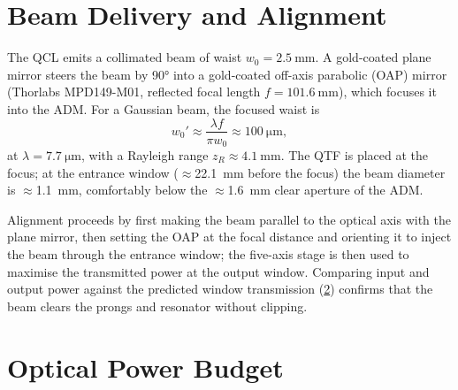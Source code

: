 \section{Beam Delivery and Alignment}
\label{sec:alignment}

The QCL emits a collimated beam of waist $w_0 = \SI{2.5}{\milli\meter}$. A
gold-coated plane mirror steers the beam by \ang{90} into a gold-coated off-axis
parabolic (OAP) mirror (Thorlabs MPD149-M01, reflected focal length
$f = \SI{101.6}{\milli\meter}$), which focuses it into the ADM. For a Gaussian
beam, the focused waist is
\begin{equation}
  \label{eq:focus}
  w_0' \approx \frac{\lambda f}{\pi w_0} \approx \SI{100}{\micro\meter},
\end{equation}
at $\lambda = \SI{7.7}{\micro\meter}$, with a Rayleigh range
$z_R \approx \SI{4.1}{\milli\meter}$. The QTF is placed at the focus; at the
entrance window (\(\approx\)\SI{22.1}{\milli\meter} before the focus) the beam
diameter is \(\approx\)\SI{1.1}{\milli\meter}, comfortably below the
\(\approx\)\SI{1.6}{\milli\meter} clear aperture of the ADM.

Alignment proceeds by first making the beam parallel to the optical axis with the
plane mirror, then setting the OAP at the focal distance and orienting it to
inject the beam through the entrance window; the five-axis stage is then used to
maximise the transmitted power at the output window. Comparing input and output
power against the predicted window transmission (\cref{sec:power-budget})
confirms that the beam clears the prongs and resonator without clipping.

\section{Optical Power Budget}
\label{sec:power-budget}

